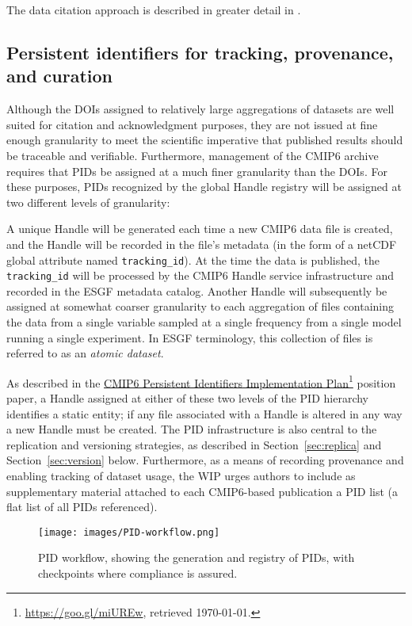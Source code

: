\documentclass[gmd,manuscript]{copernicus}
\newcommand{\pllabel}[1]{\label{p-#1}\linelabel{l-#1}}
\newcommand{\urlref}[2] {\href{#1}{#2}\footnote{\url{#1}, retrieved \today.}}
\begin{document}
The data citation approach is described in greater detail in \cite{ref:stockhauselautenschlager2017}.

\subsection{Persistent identifiers for tracking, provenance, and
  curation}
\label{sec:pid}

Although the DOIs assigned to relatively large aggregations of
datasets are well suited for citation and acknowledgment purposes,
they are not issued at fine enough granularity to meet the scientific
imperative that published results should be traceable and verifiable.
Furthermore, management of the CMIP6 archive requires that PIDs be
assigned at a much finer granularity than the DOIs. For these
purposes, PIDs recognized by the global Handle registry will be
assigned at two different levels of granularity:

A unique Handle will be generated each time a new CMIP6 data file is
created, and the Handle will be recorded in the file's metadata (in
the form of a netCDF global attribute named \texttt{tracking\_id}). At
the time the data is published, the \texttt{tracking\_id} will be
processed by the CMIP6 Handle service infrastructure and recorded in
the ESGF metadata catalog. Another Handle will subsequently be
assigned at somewhat coarser granularity to each aggregation of files
containing the data from a single variable sampled at a single
frequency
\pllabel{RC1-45}
from a single model running a single experiment. In ESGF terminology,
this collection of files is referred to as an \emph{atomic dataset}.

As described in the \urlref{https://goo.gl/miUREw}{CMIP6 Persistent
  Identifiers Implementation Plan} position paper, a Handle assigned
at either of these two levels of the PID hierarchy identifies a static
entity; if any file associated with a Handle is altered in any way a
new Handle must be created. The PID infrastructure is also central to
the replication and versioning strategies, as described in
Section~\ref{sec:replica} and Section~\ref{sec:version} below.
Furthermore, as a means of recording provenance and enabling tracking
of dataset usage, the WIP urges authors to include as supplementary
material attached to each CMIP6-based publication a PID list (a flat
list of all PIDs referenced).

\begin{figure*}
  \begin{center}
    \texttt{[image: images/PID-workflow.png]}
  \end{center}
  \caption{PID workflow, showing the generation and registry of PIDs,
    with checkpoints where compliance is assured.}
  \label{fig:pidflow}
\end{figure*}
\end{document}
